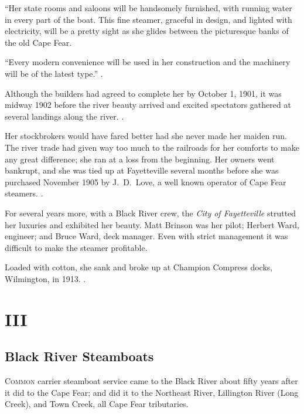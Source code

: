 \documentclass[11pt, a5paper, openright]{book}
\newcommand{\steamer}[1]{\textit{#1}\index{#1,~steamer}}
\begin{document}
``Her state rooms and saloons will be handsomely furnished, with
running water in every part of the boat.  This fine steamer, graceful
in design, and lighted with electricity, will be a pretty sight as she
glides between the picturesque banks of the old Cape Fear.\par

``Every modern convenience will be used in her construction and the
machinery will be of the latest type.''  \citep[5-31-1901]{ws}.\par

Although the builders had agreed to complete her by October 1, 1901,
it was midway 1902 before the river beauty arrived and excited
spectators gathered at several landings along the river.
\citep[4-15-1902]{ws}.\par

Her stockbrokers would have fared better had she never made her maiden
run.  The river trade had given way too much to the railroads for her
comforts to make any great difference; she ran at a loss from the
beginning.  Her owners went bankrupt, and she was tied up at
Fayetteville several months before she was purchased November 1905 by
J.~D.~Love, a well known operator of Cape Fear
steamers.  \citep[11-24-1905]{ws}.\par

For several years more, with a Black River crew, the
\steamer{City of Fayetteville} strutted her luxuries and exhibited her
beauty.  Matt Brinson was her pilot; Herbert
Ward, engineer; and Bruce Ward,
deck manager.  Even with strict management it was difficult to make
the steamer profitable.\par

Loaded with cotton, she sank and broke up at Champion Compress docks,
Wilmington, in 1913.
\citep[1-1975, p.~7]{fwm}\citep{johnsonwc}\citep{wardmb}.\par


\part{III}

\chapter{Black River Steamboats}

\textsc{Common} carrier steamboat service came to the Black River
about fifty years after it did to the Cape Fear; and did it to the
Northeast River, Lillington River (Long Creek), and Town Creek, all
Cape Fear tributaries.\par
\end{document}
